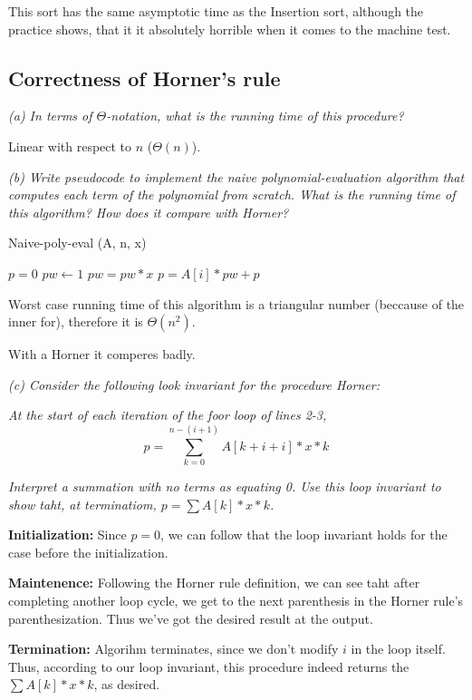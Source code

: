 \documentclass[11pt,oneside,titlepage]{book}
\begin{document}
This sort has the same asymptotic time as the Insertion sort, although the practice shows, that it
it absolutely horrible when it comes to the machine test.

\subsection{Correctness of Horner's rule}

\textit{(a) In terms of $\Theta$-notation, what is the running time of this procedure? }

Linear with respect to $n$ ($\Theta(n)$).

\textit{(b) Write pseudocode to implement the naive polynomial-evaluation algorithm that
  computes each term of the polynomial from scratch. What is the running time
  of this algorithm? How does it compare with Horner?}

\begin{function}
  \caption{Naive-poly-eval (A, n, x)}
  $p = 0$\;
   {
    $pw \leftarrow 1$ \;
     {
      $pw = pw * x$\;
    }
    $p = A[i] * pw + p$\;
  }
  \;  
\end{function}

Worst case running time of this algorithm is a triangular number (beccause of the inner for),
therefore it is $\Theta(n^2)$.

With a Horner it comperes badly.

\textit{(c) Consider the following look invariant for the procedure Horner: }

\textit{At the start of each iteration of the foor loop of lines 2-3,}
$$p = \sum_{k = 0}^{n - (i + 1)}{A[k + i + i] * x*k}$$

\textit{Interpret a summation with no terms as equating 0. Use this loop invariant to
show taht, at terminatiom, $p = \sum{A[k] * x*k}$.}

\textbf{Initialization: }
Since $p = 0$, we can follow that the loop invariant holds for the case before the initialization.

\textbf{Maintenence: }
Following the Horner rule definition, we can see taht after completing another
loop cycle, we get to the next parenthesis in the Horner rule's parenthesization. Thus
we've got the desired result at the output.

\textbf{Termination: }
Algorihm terminates, since we don't modify $i$ in the loop itself. Thus, according
to our loop invariant, this procedure indeed returns the $\sum{A[k] * x*k}$, as desired.
\end{document}
